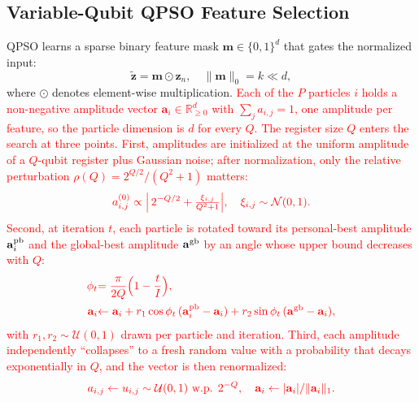 \documentclass[conference]{IEEEtran}
\begin{document}
\subsection{Variable-Qubit QPSO Feature Selection}
\label{subsec:qpsomethod}

QPSO learns a sparse binary feature mask
$\mathbf{m}\in\{0,1\}^d$ that gates the normalized input:
\begin{equation}
\tilde{\mathbf{z}} = \mathbf{m}\odot\mathbf{z}_n,\quad
\|\mathbf{m}\|_0 = k \ll d,
\label{eq:mask_gate}
\end{equation}
where $\odot$ denotes element-wise multiplication.
\textcolor{red}{Each of the $P$ particles $i$ holds a
non-negative amplitude vector $\mathbf{a}_i\in\mathbb{R}_{\ge 0}^{d}$
with $\sum_j a_{i,j}=1$, one amplitude per feature, so the particle
dimension is $d$ for every $Q$. The register size $Q$ enters the
search at three points. First, amplitudes are initialized at the
uniform amplitude of a $Q$-qubit register plus Gaussian noise; after
normalization, only the relative perturbation
$\rho(Q)=2^{Q/2}/(Q^{2}+1)$ matters:}
\begin{equation}
\textcolor{red}{a_{i,j}^{(0)} \propto \Bigl|\,2^{-Q/2} +
\tfrac{\xi_{i,j}}{Q^{2}+1}\Bigr|,\quad
\xi_{i,j}\sim\mathcal{N}(0,1).}
\label{eq:qpso_init}
\end{equation}
\textcolor{red}{Second, at iteration $t$, each particle is
rotated toward its personal-best amplitude $\mathbf{a}_i^{\rm pb}$
and the global-best amplitude $\mathbf{a}^{\rm gb}$ by an angle whose
upper bound decreases with $Q$:}
\begin{align}
\textcolor{red}{\phi_t} &\textcolor{red}{= \frac{\pi}{2Q}\Bigl(1-\frac{t}{I}\Bigr),}
\label{eq:qpso_angle}\\
\textcolor{red}{\mathbf{a}_i} &\textcolor{red}{\leftarrow \mathbf{a}_i
+ r_1\cos\phi_t\,(\mathbf{a}_i^{\rm pb}-\mathbf{a}_i)
+ r_2\sin\phi_t\,(\mathbf{a}^{\rm gb}-\mathbf{a}_i),}
\label{eq:qpso_rotation}
\end{align}
\textcolor{red}{with $r_1,r_2\sim\mathcal{U}(0,1)$ drawn per
particle and iteration. Third, each amplitude independently
``collapses'' to a fresh random value with a probability that decays
exponentially in $Q$, and the vector is then renormalized:}
\begin{equation}
\textcolor{red}{a_{i,j} \leftarrow u_{i,j}\sim\mathcal{U}(0,1)
\ \text{w.p. } 2^{-Q},\quad
\mathbf{a}_i \leftarrow |\mathbf{a}_i| / \|\mathbf{a}_i\|_1 .}
\label{eq:qpso_collapse}
\end{equation}
\end{document}
